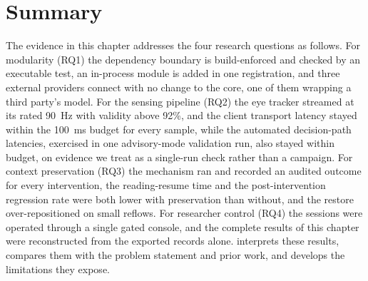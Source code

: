 \section{Summary}
\label{sec:eval-summary}

The evidence in this chapter addresses the four research questions as follows.
For modularity (RQ1) the dependency boundary is build-enforced and checked by an executable test, an in-process module is added in one registration, and three external providers connect with no change to the core, one of them wrapping a third party's model.
For the sensing pipeline (RQ2) the eye tracker streamed at its rated \SI{90}{\hertz} with validity above 92\%, and the client transport latency stayed within the \SI{100}{\milli\second} budget for every sample, while the automated decision-path latencies, exercised in one advisory-mode validation run, also stayed within budget, on evidence we treat as a single-run check rather than a campaign.
For context preservation (RQ3) the mechanism ran and recorded an audited outcome for every intervention, the reading-resume time and the post-intervention regression rate were both lower with preservation than without, and the restore over-repositioned on small reflows.
For researcher control (RQ4) the sessions were operated through a single gated console, and the complete results of this chapter were reconstructed from the exported records alone.
 interprets these results, compares them with the problem statement and prior work, and develops the limitations they expose.
